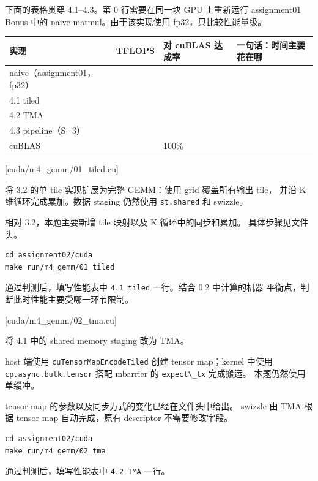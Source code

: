 \documentclass[11pt,a4paper,fontset=none]{ctexart}
\providecommand{\passthrough}[1]{#1}
\begin{document}
下面的表格贯穿 4.1--4.3。第 0 行需要在同一块 GPU 上重新运行 assignment01
Bonus 中的 naive matmul。由于该实现使用 fp32，只比较性能量级。

{\def\LTcaptype{none} %
\begin{longtable}[]{@{}llll@{}}
\toprule\noalign{}
实现 & TFLOPS & 对 cuBLAS 达成率 & 一句话：时间主要花在哪 \\
\midrule\noalign{}
\endhead
\bottomrule\noalign{}
\endlastfoot
naive（assignment01，fp32） & & & \\
4.1 tiled & & & \\
4.2 TMA & & & \\
4.3 pipeline（S=3） & & & \\
cuBLAS & & 100\% & \\
\end{longtable}
}

[cuda/m4\_gemm/01\_tiled.cu]

将 3.2 的单 tile 实现扩展为完整 GEMM：使用 grid 覆盖所有输出 tile， 并沿
K 维循环完成累加。数据 staging 仍然使用
\passthrough{\lstinline!st.shared!} 和 swizzle。

相对 3.2，本题主要新增 tile 映射以及 K 循环中的同步和累加。
具体步骤见文件头。

\begin{lstlisting}
cd assignment02/cuda
make run/m4_gemm/01_tiled
\end{lstlisting}

通过判测后，填写性能表中 \passthrough{\lstinline!4.1 tiled!} 一行。结合
0.2 中计算的机器 平衡点，判断此时性能主要受哪一环节限制。

[cuda/m4\_gemm/02\_tma.cu]

将 4.1 中的 shared memory staging 改为 TMA。

host 端使用 \passthrough{\lstinline!cuTensorMapEncodeTiled!} 创建 tensor
map；kernel 中使用 \passthrough{\lstinline!cp.async.bulk.tensor!} 搭配
mbarrier 的 \passthrough{\lstinline!expect\_tx!} 完成搬运。
本题仍然使用单缓冲。

tensor map 的参数以及同步方式的变化已经在文件头中给出。 swizzle 由 TMA
根据 tensor map 自动完成，原有 descriptor 不需要修改字段。

\begin{lstlisting}
cd assignment02/cuda
make run/m4_gemm/02_tma
\end{lstlisting}

通过判测后，填写性能表中 \passthrough{\lstinline!4.2 TMA!} 一行。
\end{document}
